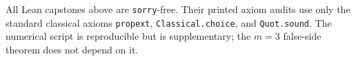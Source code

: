 \documentclass[11pt]{article}
\newcommand{\code}[1]{\nolinkurl{#1}}
\begin{document}
\medskip
\noindent All Lean capstones above are \code{sorry}-free.  Their printed axiom
audits use only the standard classical axioms
\code{propext}, \code{Classical.choice}, and \code{Quot.sound}.  The numerical
script is reproducible but is supplementary; the \(m=3\) false-side theorem
does not depend on it.
\end{document}
